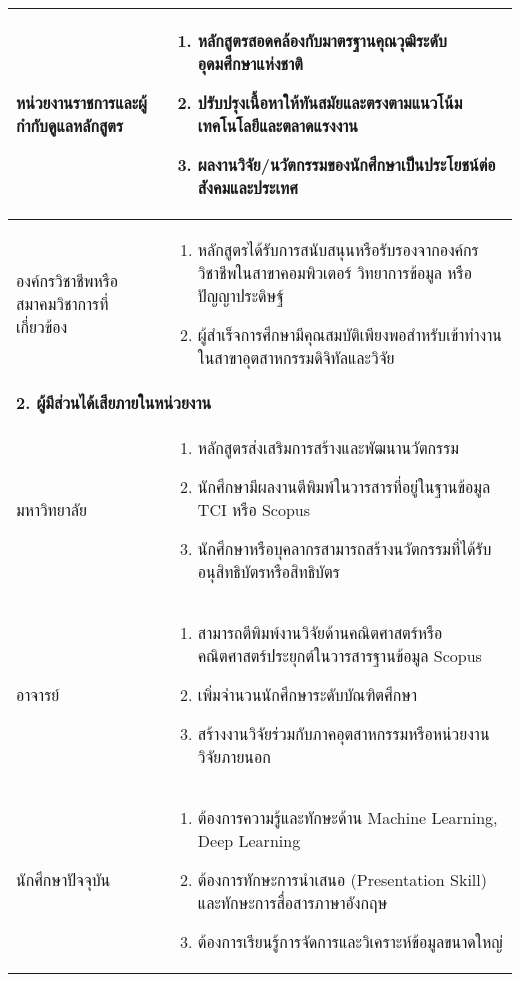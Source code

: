 \begin{longtable}{|p{} | p{}|}
หน่วยงานราชการและผู้กำกับดูแลหลักสูตร &
\begin{enumerate}
  \item หลักสูตรสอดคล้องกับมาตรฐานคุณวุฒิระดับอุดมศึกษาแห่งชาติ
  \item ปรับปรุงเนื้อหาให้ทันสมัยและตรงตามแนวโน้มเทคโนโลยีและตลาดแรงงาน
  \item ผลงานวิจัย/นวัตกรรมของนักศึกษาเป็นประโยชน์ต่อสังคมและประเทศ
\end{enumerate} \\ \hline

องค์กรวิชาชีพหรือสมาคมวิชาการที่เกี่ยวข้อง &
\begin{enumerate}
  \item หลักสูตรได้รับการสนับสนุนหรือรับรองจากองค์กรวิชาชีพในสาขาคอมพิวเตอร์ วิทยาการข้อมูล หรือปัญญาประดิษฐ์
  \item ผู้สำเร็จการศึกษามีคุณสมบัติเพียงพอสำหรับเข้าทำงานในสาขาอุตสาหกรรมดิจิทัลและวิจัย
\end{enumerate} \\ \hline

\multicolumn{2}{|l|}{\textbf{2. ผู้มีส่วนได้เสียภายในหน่วยงาน}} \\ \hline

มหาวิทยาลัย &
\begin{enumerate}
  \item หลักสูตรส่งเสริมการสร้างและพัฒนานวัตกรรม
  \item นักศึกษามีผลงานตีพิมพ์ในวารสารที่อยู่ในฐานข้อมูล TCI หรือ Scopus
  \item นักศึกษาหรือบุคลากรสามารถสร้างนวัตกรรมที่ได้รับอนุสิทธิบัตรหรือสิทธิบัตร
\end{enumerate} \\ \hline

อาจารย์ &
\begin{enumerate}
  \item สามารถตีพิมพ์งานวิจัยด้านคณิตศาสตร์หรือคณิตศาสตร์ประยุกต์ในวารสารฐานข้อมูล Scopus
  \item เพิ่มจำนวนนักศึกษาระดับบัณฑิตศึกษา
  \item สร้างงานวิจัยร่วมกับภาคอุตสาหกรรมหรือหน่วยงานวิจัยภายนอก
\end{enumerate} \\ \hline

นักศึกษาปัจจุบัน &
\begin{enumerate}
  \item ต้องการความรู้และทักษะด้าน Machine Learning, Deep Learning
  \item ต้องการทักษะการนำเสนอ (Presentation Skill) และทักษะการสื่อสารภาษาอังกฤษ
  \item ต้องการเรียนรู้การจัดการและวิเคราะห์ข้อมูลขนาดใหญ่
\end{enumerate} \\ \hline


\end{longtable}
